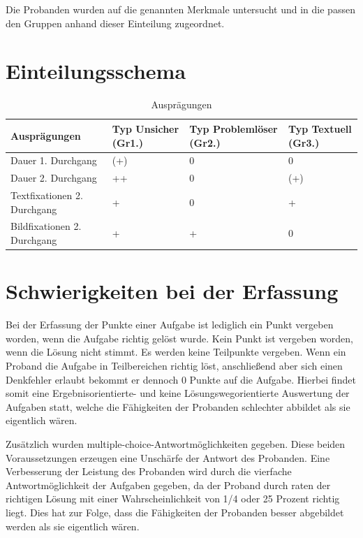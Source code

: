Die Probanden wurden auf die genannten Merkmale untersucht und in die passen den Gruppen anhand dieser Einteilung zugeordnet.
\section*{Einteilungsschema}

\begin{table}[!h]
\hspace{-5pt}
\begin{tabularx}{\textwidth + 5pt}{| @{\hspace{3pt}} M || @{\hspace{3pt}} M  | @{\hspace{3pt}} M  | @{\hspace{3pt}} M |}
\hline
\textbf{Ausprägungen} & \textbf{Typ Unsicher (Gr1.)} & \textbf{Typ Problemlöser (Gr2.)} & \textbf{Typ Textuell (Gr3.)}\\
\hline
\hline
Dauer 1. Durchgang          & (+) & 0 & 0\\
\hline
Dauer 2. Durchgang          & ++ & 0 & (+)\\
\hline
Textfixationen 2. Durchgang & + & 0 & +\\
\hline
Bildfixationen 2. Durchgang & + & + & 0\\
\hline
\end{tabularx}
\caption{Ausprägungen}
\end{table}



\section{Schwierigkeiten bei der Erfassung}

Bei der Erfassung der Punkte einer Aufgabe ist lediglich ein Punkt vergeben worden, wenn die Aufgabe richtig gelöst wurde. Kein Punkt ist vergeben worden, wenn die Lösung nicht stimmt. Es werden keine Teilpunkte vergeben. Wenn ein Proband die Aufgabe in Teilbereichen richtig löst, anschließend aber sich einen Denkfehler erlaubt bekommt er dennoch 0 Punkte auf die Aufgabe. Hierbei findet somit eine Ergebnisorientierte- und keine Lösungswegorientierte Auswertung der Aufgaben statt, welche die Fähigkeiten der Probanden schlechter abbildet als sie eigentlich wären.

Zusätzlich wurden multiple-choice-Antwortmöglichkeiten gegeben. Diese beiden Voraussetzungen erzeugen eine Unschärfe der Antwort des Probanden. Eine Verbesserung der Leistung des Probanden wird durch die vierfache Antwortmöglichkeit der Aufgaben gegeben, da der Proband durch raten der richtigen Lösung mit einer Wahrscheinlichkeit von 1/4 oder 25 Prozent richtig liegt. Dies hat zur Folge, dass die Fähigkeiten der Probanden besser abgebildet werden als sie eigentlich wären.  

